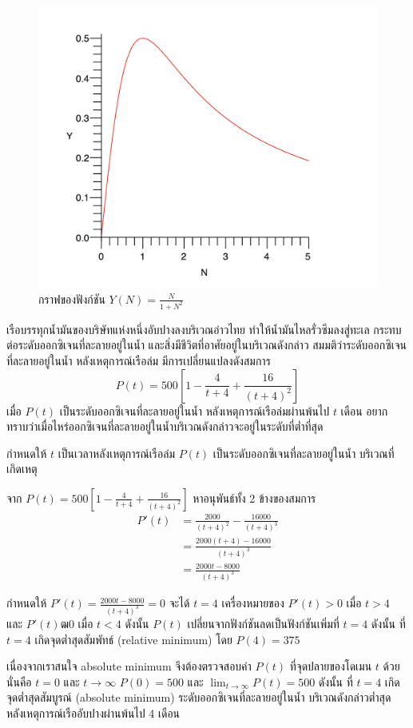 \documentclass[
]{book}
\begin{document}
\begin{figure}

{\centering \includegraphics[width=0.5\linewidth]{images/graph8} 

}

\caption{กราฟของฟังก์ชัน $Y(N) = \frac{N}{1 + N^2}$}\label{fig:graph8}
\end{figure}

เรือบรรทุกน้ำมันของบริษัทแห่งหนึ่งอับปางลงบริเวณอ่าวไทย ทำให้น้ำมันไหลรั่วซึมลงสู่ทะเล
กระทบต่อระดับออกซิเจนที่ละลายอยู่ในน้ำ และสิ่งมีชีวิตที่อาศัยอยู่ในบริเวณดังกล่าว
สมมติว่าระดับออกซิเจนที่ละลายอยู่ในน้ำ หลังเหตุการณ์เรือล่ม มีการเปลี่ยนแปลงดังสมการ
\[P(t)=500[1- \frac{4}{t+4} + \frac{16}{(t+4)^2}]\] เมื่อ \(P(t)\)
เป็นระดับออกซิเจนที่ละลายอยู่ในน้ำ หลังเหตุการณ์เรือล่มผ่านพ้นไป \(t\) เดือน
อยากทราบว่าเมื่อไหร่ออกซิเจนที่ละลายอยู่ในน้ำบริเวณดังกล่าวจะอยู่ในระดับที่ต่ำที่สุด

กำหนดให้ \(t\) เป็นเวลาหลังเหตุการณ์เรือล่ม \(P(t)\) เป็นระดับออกซิเจนที่ละลายอยู่ในน้ำ
บริเวณที่เกิดเหตุ

จาก \(P(t)=500[1- \frac{4}{t+4} + \frac{16}{(t+4)^2}]\) หาอนุพันธ์ทั้ง 2
ข้างของสมการ \begin{equation}   \begin{aligned}
    P'(t) &= \frac{2000}{(t+4)^2} - \frac{16000}{(t+4)^3} \\
          &=\frac{2000(t+4)-16000}{(t+4)^3} \\
          &=\frac{2000t-8000}{(t+4)^3}
  \end{aligned} \end{equation}

กำหนดให้ \(\displaystyle P'(t)= \frac{2000t-8000}{(t+4)^3}=0\) จะได้
\(t=4\) เครื่องหมายของ \(P'(t) > 0\) เมื่อ \(t > 4\) และ \(P'(t) ฒ 0\) เมื่อ
\(t < 4\) ดังนั้น \(P(t)\) เปลี่ยนจากฟังก์ชันลดเป็นฟังก์ชันเพิ่มที่ \(t=4\) ดังนั้น ที่
\(t=4\) เกิดจุดต่ำสุดสัมพัทธ์ (relative minimum) โดย \(P(4)=375\)

เนื่องจากเราสนใจ absolute minimum จึงต้องตรวจสอบค่า \(P(t)\) ที่จุดปลายของโดเมน
\(t\) ด้วย นั่นคือ \(t = 0\) และ \(t \rightarrow \infty\) \(P(0)=500\) และ
\(\lim_{t \rightarrow \infty} P(t) = 500\) ดังนั้น ที่ \(t=4\) เกิดจุดต่ำสุดสัมบูรณ์
(absolute minimum) ระดับออกซิเจนที่ละลายอยู่ในน้ำ บริเวณดังกล่าวต่ำสุด
หลังเหตุการณ์เรืออับปางผ่านพ้นไป 4 เดือน
\end{document}
